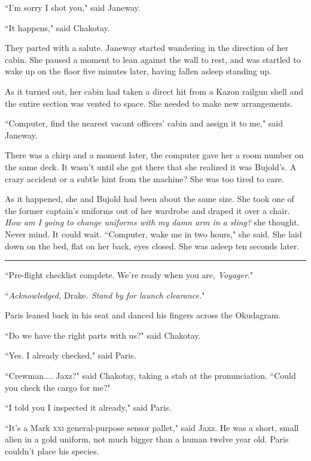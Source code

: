 \documentclass[twoside,letterpaper,12pt]{memoir}
\begin{document}
``I'm sorry I shot you," said Janeway.

``It happens," said Chakotay.

They parted with a salute. Janeway started wandering in the direction of her cabin. She paused a moment to lean against the wall to rest, and was startled to wake up on the floor five minutes later, having fallen asleep standing up.

As it turned out, her cabin had taken a direct hit from a Kazon railgun shell and the entire section was vented to space. She needed to make new arrangements.

``Computer, find the nearest vacant officers' cabin and assign it to me," said Janeway.

There was a chirp and a moment later, the computer gave her a room number on the same deck. It wasn't until she got there that she realized it was Bujold's. A crazy accident or a subtle hint from the machine? She was too tired to care.

As it happened, she and Bujold had been about the same size. She took one of the former captain's uniforms out of her wardrobe and draped it over a chair. \textit{How am I going to change uniforms with my damn arm in a sling?} she thought. Never mind. It could wait. ``Computer, wake me in two hours," she said. She laid down on the bed, flat on her back, eyes closed. She was asleep ten seconds later.

\begin{center}\rule{3cm}{0.4 pt}\end{center}

``Pre-flight checklist complete. We're ready when you are, \textit{Voyager}."

``\textit{Acknowledged, }Drake\textit{. Stand by for launch clearance.}"

Paris leaned back in his seat and danced his fingers across the Okudagram.

``Do we have the right parts with us?" said Chakotay.

``Yes. I already checked," said Paris.

``Crewman.... Jaxz?" said Chakotay, taking a stab at the pronunciation. ``Could you check the cargo for me?"

``I told you I inspected it already," said Paris.

``It's a Mark \textsc{xxi} general-purpose sensor pallet," said Jaxz. He was a short, small alien in a gold uniform, not much bigger than a human twelve year old. Paris couldn't place his species.
\end{document}
